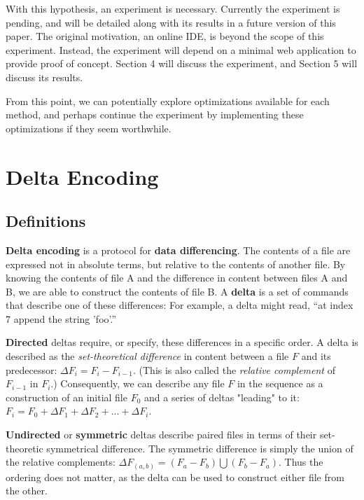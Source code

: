 \documentclass[12pt,a4paper]{article}
\begin{document}
	With this hypothesis, an experiment is necessary. Currently the experiment is pending, and will be detailed along with its results in a future version of this paper. The original motivation, an online IDE, is beyond the scope of this experiment. Instead, the experiment will depend on a minimal web application to provide proof of concept. Section 4 will discuss the experiment, and Section 5 will discuss its results.
	
	From this point, we can potentially explore optimizations available for each method, and perhaps continue the experiment by implementing these optimizations if they seem worthwhile.
	
	\pagebreak
	\section{Delta Encoding}
		
		\subsection{Definitions}
		
		\textbf{Delta encoding} is a protocol for \textbf{data differencing}. The contents of a file are expressed not in absolute terms, but relative to the contents of another file. By knowing the contents of file A and the difference in content between files A and B, we are able to construct the contents of file B. A \textbf{delta} is a set of commands that describe one of these differences: For example, a delta might read, \textquotedblleft at index 7 append the string 'foo'.\textquotedblright
		
		\textbf{Directed} deltas require, or specify, these differences in a specific order. A delta is described as the \textit{set-theoretical difference} in content between a file $F$ and its predecessor: $\Delta F_i = F_i - F_{i-1}$. (This is also called the \textit{relative complement} of $F_{i-1}$ in $F_i$.) Consequently, we can describe any file $F$ in the sequence as a construction of an initial file $F_0$ and a series of deltas "leading" to it: $F_i = F_0 + \Delta F_1 + \Delta F_2 + ... + \Delta F_i$.
		
		\textbf{Undirected} or \textbf{symmetric} deltas describe paired files in terms of their set-theoretic symmetrical difference. The symmetric difference is simply the union of the relative complements: $\Delta F_{(a,b)} = (F_a - F_b) \bigcup (F_b - F_a)$. Thus the ordering does not matter, as the delta can be used to construct either file from the other.
		
\end{document}
